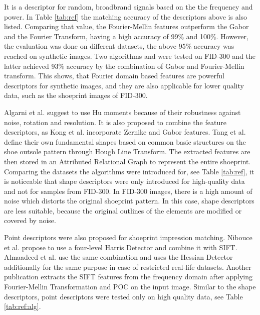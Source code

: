 \documentclass[draft,final]{vutinfth} %
\begin{document}
It is a descriptor for random, broadbrand signals based on the the frequency and power.
In Table \ref{tab:ref} the matching accuracy of the descriptors above is also listed.
Comparing that value, the Fourier-Mellin features outperform the Gabor and the Fourier Transform, having a high accuracy of	 99\% and 100\%.
However, the  evaluation was done on different datasets, the above 95\% accuracy was reached on synthetic images.
Two algorithms \cite{kortylewski2014unsupervised} and \cite{wu2019crime} were tested on FID-300 and the latter achieved 93\% accuracy by the combination of Gabor and Fourier-Mellin transform.
This shows, that Fourier domain based features are powerful descriptors for synthetic images, and they are also applicable for lower quality data, such as the shoeprint images of FID-300.
\par
Algarni et al. \cite{algarni2008novel} suggest to use Hu moments because of their robustness against noise, rotation and resolution.
It is also proposed to combine the feature descriptors, as Kong et al. \cite{kong2014novel} incorporate Zernike and Gabor features.
Tang et al. \cite{tang2010footwear} define their own fundamental shapes based on common basic structures on the shoe outsole pattern through Hough Line Transform. 
The extracted features are then stored in an Attributed Relational Graph to represent the entire shoeprint.
Comparing the datasets the algorithms were introduced for, see Table \ref{tab:ref}, it is noticeable that shape descriptors were only introduced for high-quality data and not for samples from FID-300.
In FID-300 images, there is a high amount of noise which distorts the original shoeprint pattern.
In this case, shape descriptors are less suitable, because the original outlines of the elements are modified or covered by noise.
\par
Point descriptors were also proposed for shoeprint impression matching.
Nibouce et al. \cite{nibouche2009rotation} propose to use a four-level Harris Detector and combine it with SIFT.
Almaadeed et al. \cite{almaadeed2015partial} use the same combination and uses the Hessian Detector additionally for the same purpose in case of restricted real-life datasets.
Another publication \cite{richetelli2017classification} extracts the SIFT features from the frequency domain after applying Fourier-Mellin Transformation and POC on the input image.
Similar to the shape descriptors, point descriptors were tested only on high quality data, see Table \ref{tab:ref:alg}.
\end{document}
